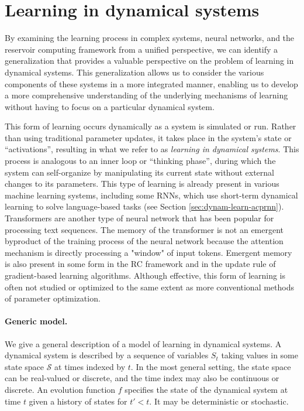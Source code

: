 \section{Learning in dynamical systems}

By examining the learning process in complex systems, neural networks, and
the reservoir computing framework from a unified perspective, we can
identify a generalization that provides a valuable perspective on the problem of
learning in dynamical systems. This generalization allows us to consider the
various components of these systems in a more integrated manner, enabling us to
develop a more comprehensive understanding of the underlying mechanisms of
learning without having to focus on a particular dynamical system.

This form of learning occurs dynamically as a system is simulated or run. Rather
than using traditional parameter updates, it takes place in the system's state
or ``activations'', resulting in what we refer to as \emph{learning in dynamical
  systems}. This process is analogous to an inner loop or ``thinking phase'',
during which the system can self-organize by manipulating its current state
without external changes to its parameters. This type of learning is already
present in various machine learning systems, including some \acfp{RNN}, which
use short-term dynamical learning to solve language-based tasks (see Section
\ref{sec:dynam-learn-acprnn}). Transformers are another type of neural network 
that has been popular for processing text sequences. The memory of the transformer 
is not an emergent byproduct of the training process of the neural network because 
the attention mechanism is directly processing a "window" of input tokens. Emergent 
memory is also present in some form in the \ac{RC}
framework and in the update rule of gradient-based learning algorithms. Although
effective, this form of learning is often not studied or optimized to the same
extent as more conventional methods of parameter optimization.

\paragraph{Generic model.}\label{sec:generic-model}
We give a general description of a model of learning in dynamical systems. A
dynamical system is described by a sequence of variables $S_{t}$ taking values
in some state space $\mathcal{S}$ at times indexed by $t$. In the most general setting, the
state space can be real-valued or discrete, and the time index may also be
continuous or discrete. An evolution function $f$ specifies the state of the
dynamical system at time $t$ given a history of states for $t' < t$. It may be
deterministic or stochastic.

